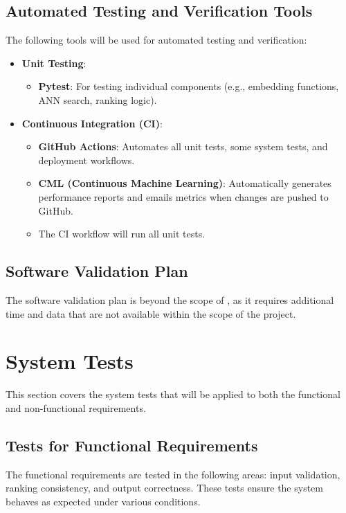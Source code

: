 \documentclass[12pt, titlepage]{article}
\begin{document}
\subsection{Automated Testing and Verification Tools}
The following tools will be used for automated testing and verification:
\begin{itemize}
\item \textbf{Unit Testing}:
\begin{itemize}
\item \textbf{Pytest}: For testing individual components (e.g., embedding functions, ANN search, ranking logic).
\end{itemize}
\item \textbf{Continuous Integration (CI)}:
\begin{itemize}
\item \textbf{GitHub Actions}: Automates all unit tests, some system tests, and deployment workflows.
\item \textbf{CML (Continuous Machine Learning)}: Automatically generates performance reports and emails metrics when changes are pushed to GitHub.
\item The CI workflow will run all unit tests.
\end{itemize}
\end{itemize}

\subsection{Software Validation Plan}

The software validation plan is beyond the scope of \progname, as it requires additional time and data that are not available within the scope of the project.

\section{System Tests}\label{SystemTest}

This section covers the system tests that will be applied to both the functional and non-functional requirements.

\subsection{Tests for Functional Requirements}

The functional requirements are tested in the following areas: input validation, ranking consistency, and output correctness. These tests ensure the system behaves as expected under various conditions.
\end{document}
